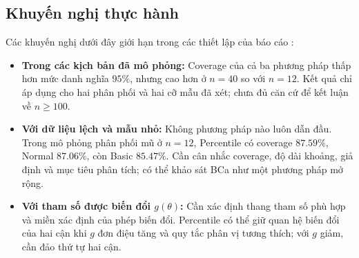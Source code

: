 	\newpage
\subsection{Khuyến nghị thực hành}
	
	Các khuyến nghị dưới đây giới hạn trong các thiết lập của báo cáo \cite{buithuytrang2026, efron1993}:
	\begin{itemize}
    \item \textbf{Trong các kịch bản đã mô phỏng:} Coverage của cả ba phương pháp thấp hơn mức danh nghĩa $95\%$, nhưng cao hơn ở $n=40$ so với $n=12$. Kết quả chỉ áp dụng cho hai phân phối và hai cỡ mẫu đã xét; chưa đủ căn cứ để kết luận về $n\ge100$.
    \item \textbf{Với dữ liệu lệch và mẫu nhỏ:} Không phương pháp nào luôn dẫn đầu. Trong mô phỏng phân phối mũ ở $n=12$, Percentile có coverage $87.59\%$, Normal $87.06\%$, còn Basic $85.47\%$. Cần cân nhắc coverage, độ dài khoảng, giả định và mục tiêu phân tích; có thể khảo sát BCa như một phương pháp mở rộng.
    \item \textbf{Với tham số được biến đổi $g(\theta)$:} Cần xác định thang tham số phù hợp và miền xác định của phép biến đổi. Percentile có thể giữ quan hệ biến đổi của hai cận khi $g$ đơn điệu tăng và quy tắc phân vị tương thích; với $g$ giảm, cần đảo thứ tự hai cận.
\end{itemize}
	
